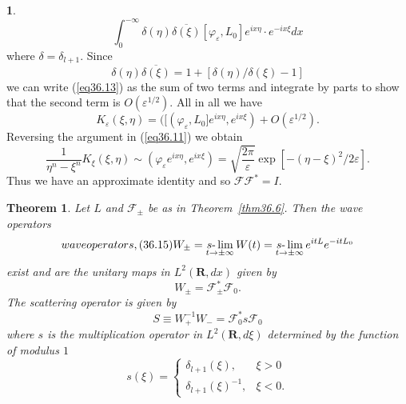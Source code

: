 \documentclass{surv-l}
\theoremstyle{plain}
\newtheorem{theorem}{Theorem}[section]
\theoremstyle{definition}
\newtheorem*{sop}{\sc{Sketch of Proof}}
\numberwithin{equation}{chapter}
\begin{document}
\begin{sop}
\begin{equation}\label{eq36.13}
\int_{0}^{-\infty}\delta(\eta)\overline{\delta(\xi)}[\varphi_{\varepsilon}, L_{0}]e^{ix\eta}\cdot e^{-ix\xi}dx
\end{equation}
where $\delta=\delta_{l+1}$. Since
\begin{equation*}
\delta(\eta)\overline{\delta(\xi)}=1+[\delta(\eta)/\delta(\xi)-1]
\end{equation*}
we can write (\ref{eq36.13}) as the sum of two terms and integrate by parts to show that the second term is $O(\varepsilon^{1/2})$. All in all we have
\begin{equation*}
K_{\varepsilon}(\xi,\eta)=([(\varphi_{\varepsilon}, L_{0}]e^{ix\eta}, e^{ix\xi})+O(\varepsilon^{1/2}).
\end{equation*}
Reversing the argument in (\ref{eq36.11}) we obtain
\begin{equation*}
\frac{1}{\eta^{n}-\xi^{n}}K_{\xi}(\xi, \eta)\sim(\varphi_{\varepsilon}e^{ix\eta}, e^{ix\xi})=\sqrt{\frac{2\pi}{\varepsilon}}\exp[-(\eta-\xi)^{2}/2\varepsilon].
\end{equation*}
Thus we have an approximate identity and so $\mathscr{F}\!\!\mathscr{F}^{*}=I$.
\end{sop}
\setcounter{theorem}{13}
\begin{theorem}\label{thm36.14}
Let $L$ and $\mathscr{F}_{\pm}$ be as in Theorem~\emph{\ref{thm36.6}}. Then the wave operators
\setcounter{equation}{14}
\begin{equation}\label{eq36.15}\index{subject}{wave operators, (36.15)}
W_{\pm}=\mathop{s\text{-}\lim}_{t\rightarrow\pm\infty}W(t)=\mathop{s\text{-}\lim}_{t\rightarrow\pm\infty}e^{itL}e^{-itL_{0}}
\end{equation}
exist and are the unitary maps in $L^{2}(\mathbf{R}, dx)$ given by
\begin{equation}\label{eq36.16}
W_{\pm}=\mathscr{F}_{\pm}^{*}\mathscr{F}_{0}.
\end{equation}
The scattering operator is given by
\begin{equation}\label{eq36.17}
S\equiv W_{+}^{-1}W_{-}=\mathscr{F}_{0}^{*}s\mathscr{F}_{0}
\end{equation}
where $s$ is the multiplication operator in $L^{2} (\mathbf{R}, d\xi)$ determined by the function of modulus $1$
\begin{equation}\label{eq36.18}
s(\xi)=\left\{\begin{array}{ll}
\delta_{l+1}(\xi), & \xi>0\\
\delta_{l+1}(\xi)^{-1}, & \xi<0.
\end{array}\right.
\end{equation}
\end{theorem}
\end{document}
